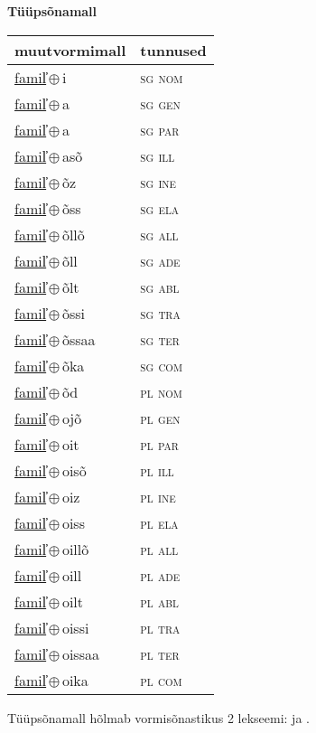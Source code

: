 

\vspace{3.5em}
\noindent \begin{minipage}{\textwidth}
\noindent \textbf{Tüüpsõnamall \,}\\

\begin{sideways}
\begin{tabular}{l l}
muutvormimall & tunnused \\
\hline
\underline{famil̕}\,$\oplus$\,i & \textsc{ sg nom } \\
\underline{famil̕}\,$\oplus$\,a & \textsc{ sg gen } \\
\underline{famil̕}\,$\oplus$\,a & \textsc{ sg par } \\
\underline{famil̕}\,$\oplus$\,asõ & \textsc{ sg ill } \\
\underline{famil̕}\,$\oplus$\,õz & \textsc{ sg ine } \\
\underline{famil̕}\,$\oplus$\,õss & \textsc{ sg ela } \\
\underline{famil̕}\,$\oplus$\,õllõ & \textsc{ sg all } \\
\underline{famil̕}\,$\oplus$\,õll & \textsc{ sg ade } \\
\underline{famil̕}\,$\oplus$\,õlt & \textsc{ sg abl } \\
\underline{famil̕}\,$\oplus$\,õssi & \textsc{ sg tra } \\
\underline{famil̕}\,$\oplus$\,õssaa & \textsc{ sg ter } \\
\underline{famil̕}\,$\oplus$\,õka & \textsc{ sg com } \\
\underline{famil̕}\,$\oplus$\,õd & \textsc{ pl nom } \\
\underline{famil̕}\,$\oplus$\,ojõ & \textsc{ pl gen } \\
\underline{famil̕}\,$\oplus$\,oit & \textsc{ pl par } \\
\underline{famil̕}\,$\oplus$\,oisõ & \textsc{ pl ill } \\
\underline{famil̕}\,$\oplus$\,oiz & \textsc{ pl ine } \\
\underline{famil̕}\,$\oplus$\,oiss & \textsc{ pl ela } \\
\underline{famil̕}\,$\oplus$\,oillõ & \textsc{ pl all } \\
\underline{famil̕}\,$\oplus$\,oill & \textsc{ pl ade } \\
\underline{famil̕}\,$\oplus$\,oilt & \textsc{ pl abl } \\
\underline{famil̕}\,$\oplus$\,oissi & \textsc{ pl tra } \\
\underline{famil̕}\,$\oplus$\,oissaa & \textsc{ pl ter } \\
\underline{famil̕}\,$\oplus$\,oika & \textsc{ pl com } \\
\end{tabular}
\end{sideways}
\label{tab:tüüpsõnamall-famil̕i}

\end{minipage}

 
\vspace{1em}
\noindent Tüüpsõnamall  hõlmab vormisõnastikus 2 lekseemi:  ja .
